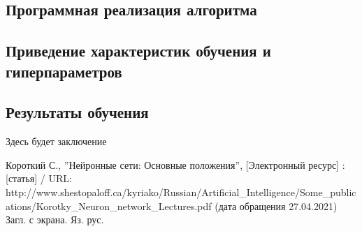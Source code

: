 \documentclass[bachelor, och, coursework]{SCWorks}
\begin{document}
    \subsection{Программная реализация алгоритма}

    \subsection{Приведение характеристик обучения и гиперпараметров}

    \subsection{Результаты обучения}

\conclusion

    Здесь будет заключение

\begin{thebibliography}{99}
     Короткий С., ''Нейронные сети: Основные положения'', [Электронный ресурс] : [статья] / URL: http://www.shestopaloff.ca/kyriako/Russian/Artificial_Intelligence/Some_publications/Korotky_Neuron_network_Lectures.pdf  (дата обращения 27.04.2021) Загл. с экрана. Яз. рус.


    

\end{thebibliography}
\end{document}
